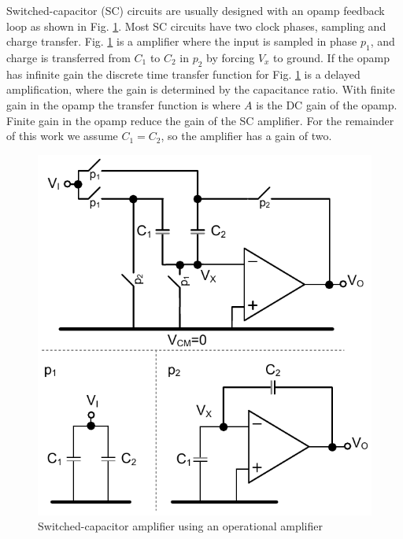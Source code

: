 Switched-capacitor (SC) circuits are usually designed with an opamp feedback loop as shown in
Fig. \ref{cdesfig:sccmult}. Most SC circuits have two clock phases,
sampling and charge transfer. Fig. \ref{cdesfig:sccmult} is a  
amplifier where the input is sampled in phase $p_1$, and charge is
transferred from
$C_1$ to $C_2$ in $p_2$ by forcing $V_x$ to
ground. If the opamp has infinite gain the discrete time transfer
function for Fig. \ref{cdesfig:sccmult} is a  delayed
amplification, where the gain is determined by the capacitance
ratio.
With finite gain in the opamp the transfer function is
where $A$ is the DC gain of the opamp.  Finite gain in the
opamp reduce the gain of the SC amplifier.  For the remainder of this work we assume $C_1 = C_2$, so the
amplifier has a gain of two.


\begin{figure}[htbp]
\centerline{ \includegraphics[width=\myfigwidth]{graphics/sccmult}}
  \caption{Switched-capacitor amplifier using an operational amplifier}
  \label{cdesfig:sccmult}
\end{figure}

